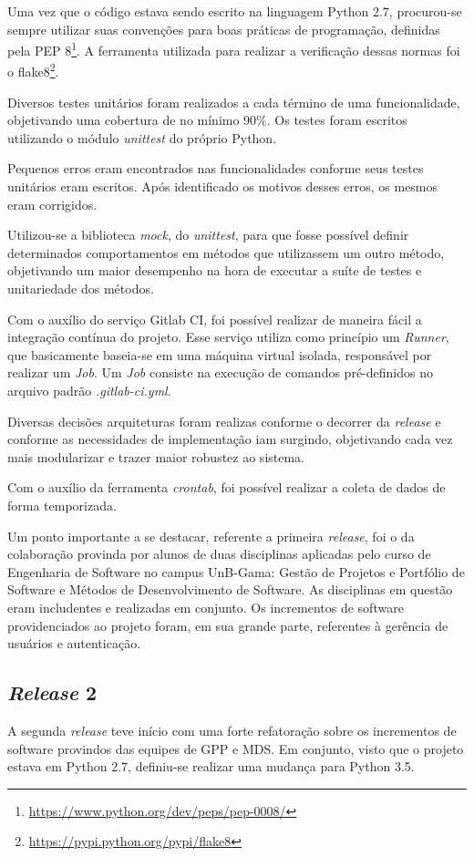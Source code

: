 Uma vez que o código estava sendo escrito na linguagem Python 2.7, procurou-se sempre utilizar suas convenções para boas práticas de programação, definidas pela PEP 8\footnote{\url{https://www.python.org/dev/peps/pep-0008/}}. A ferramenta utilizada para realizar a verificação dessas normas foi o flake8\footnote{\url{https://pypi.python.org/pypi/flake8}}.

Diversos testes unitários foram realizados a cada término de uma funcionalidade, objetivando uma cobertura de no mínimo 90\%. Os testes foram escritos utilizando o módulo \textit{unittest} do próprio Python.

Pequenos erros eram encontrados nas funcionalidades conforme seus testes unitários eram escritos. Após identificado os motivos desses erros, os mesmos eram corrigidos.

Utilizou-se a biblioteca \textit{mock}, do \textit{unittest}, para que fosse possível definir determinados comportamentos em métodos que utilizassem um outro método, objetivando um maior desempenho na hora de executar a suíte de testes e unitariedade dos métodos.

Com o auxílio do serviço Gitlab CI, foi possível realizar de maneira fácil a integração contínua do projeto. Esse serviço utiliza como princípio um \textit{Runner}, que basicamente baseia-se em uma máquina virtual isolada, responsável por realizar um \textit{Job}. Um \textit{Job} consiste na execução de comandos pré-definidos no arquivo padrão \textit{.gitlab-ci.yml}.

Diversas decisões arquiteturas foram realizas conforme o decorrer da \textit{release} e conforme as necessidades de implementação iam surgindo, objetivando cada vez mais modularizar e trazer maior robustez ao sistema.

Com o auxílio da ferramenta \textit{crontab}, foi possível realizar a coleta de dados de forma temporizada.

Um ponto importante a se destacar, referente a primeira \textit{release}, foi o da colaboração provinda por alunos de duas disciplinas aplicadas pelo curso de Engenharia de Software no campus UnB-Gama: Gestão de Projetos e Portfólio de Software e Métodos de Desenvolvimento de Software. As disciplinas em questão eram includentes e realizadas em conjunto. Os incrementos de software providenciados ao projeto foram, em sua grande parte, referentes à gerência de usuários e autenticação.

\subsection{\textit{Release} 2}
A segunda \textit{release} teve início com uma forte refatoração sobre os incrementos de software provindos das equipes de GPP e MDS. Em conjunto, visto que o projeto estava em Python 2.7, definiu-se realizar uma mudança para Python 3.5.

